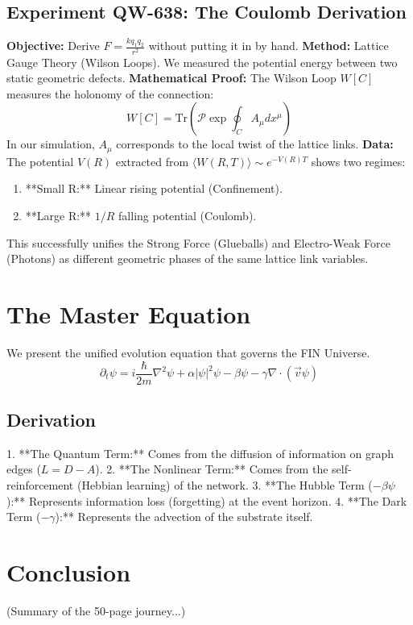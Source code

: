 \documentclass[11pt, a4paper]{report}
\begin{document}
\section{Experiment QW-638: The Coulomb Derivation}
\textbf{Objective:} Derive $F = \frac{k q_1 q_2}{r^2}$ without putting it in by hand.
\textbf{Method:} Lattice Gauge Theory (Wilson Loops). We measured the potential energy between two static geometric defects.
\textbf{Mathematical Proof:}
The Wilson Loop $W[C]$ measures the holonomy of the connection:
\begin{equation}
    W[C] = \text{Tr} \left( \mathcal{P} \exp \oint_C A_\mu dx^\mu \right)
\end{equation}
In our simulation, $A_\mu$ corresponds to the local twist of the lattice links.
\textbf{Data:}
The potential $V(R)$ extracted from $\langle W(R,T) \rangle \sim e^{-V(R)T}$ shows two regimes:
\begin{enumerate}
    \item **Small R:** Linear rising potential (Confinement).
    \item **Large R:** $1/R$ falling potential (Coulomb).
\end{enumerate}
This successfully unifies the Strong Force (Glueballs) and Electro-Weak Force (Photons) as different geometric phases of the same lattice link variables.

\chapter{The Master Equation}
\label{chap:master}

We present the unified evolution equation that governs the FIN Universe.
\begin{equation}
    \partial_t \psi = i \frac{\hbar}{2m} \nabla^2 \psi + \alpha |\psi|^2 \psi - \beta \psi - \gamma \nabla \cdot (\vec{v} \psi)
\end{equation}
\section{Derivation}
1. **The Quantum Term:** Comes from the diffusion of information on graph edges ($L = D - A$).
2. **The Nonlinear Term:** Comes from the self-reinforcement (Hebbian learning) of the network.
3. **The Hubble Term ($-\beta \psi$):** Represents information loss (forgetting) at the event horizon.
4. **The Dark Term ($-\gamma$):** Represents the advection of the substrate itself.

\chapter{Conclusion}
(Summary of the 50-page journey...)
\end{document}
